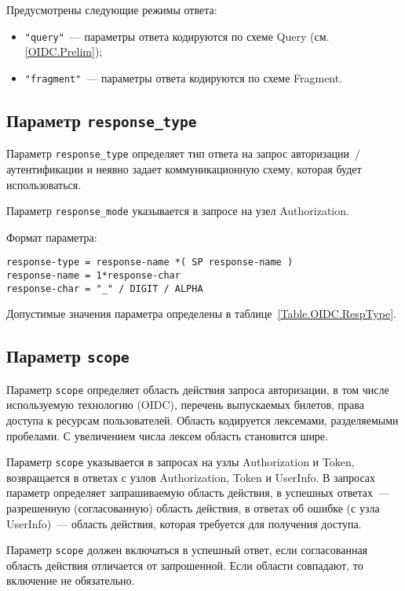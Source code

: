 Предусмотрены следующие режимы ответа:
%
\begin{itemize}
\item
\lstinline{"query"}~--- 
параметры ответа кодируются по схеме Query (см. \ref{OIDC.Prelim});

\item
\lstinline{"fragment"}~--- 
параметры ответа кодируются по схеме Fragment.
\end{itemize}

\subsection{Параметр \lstinline{response_type}}\label{PARAMS.RespType}

Параметр \lstinline{response_type} определяет тип ответа на запрос 
авторизации~/ аутентификации и неявно задает коммуникационную схему, которая 
будет использоваться. 

Параметр \lstinline{response_mode} указывается в запросе на узел Authorization.

Формат параметра:
\begin{lstlisting}
response-type = response-name *( SP response-name )
response-name = 1*response-char
response-char = "_" / DIGIT / ALPHA
\end{lstlisting}

Допустимые значения параметра определены в таблице~\ref{Table.OIDC.RespType}.

\subsection{Параметр \lstinline{scope}}\label{PARAMS.Scope}

Параметр \lstinline{scope} определяет область действия запроса авторизации,
в том числе используемую технологию (OIDC), перечень выпускаемых билетов,
права доступа к ресурсам пользователей. Область кодируется лексемами, 
разделяемыми пробелами. С увеличением числа лексем область становится шире.

Параметр \lstinline{scope} указывается в запросах на узлы Authorization и 
Token, возвращается в ответах с узлов Authorization, Token и UserInfo.
%
В запросах параметр определяет запрашиваемую область действия, в успешных 
ответах~--- разрешенную (согласованную) область действия, в ответах об ошибке 
(с узла UserInfo)~--- область действия, которая требуется для получения 
доступа. 

Параметр \lstinline{scope} должен включаться в успешный ответ, если 
согласованная область действия отличается от запрошенной. Если области 
совпадают, то включение не обязательно.

